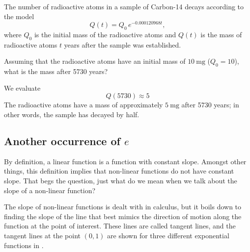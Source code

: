 \begin{pccexample}
	The number of radioactive atoms in a sample of Carbon-14 decays according to the model
	\[
		Q(t)= Q_0\,e^{-0.000120968t},
	\]
	where $Q_0$ is the initial mass of the radioactive atoms and $Q(t)$ is the mass of radioactive atoms $t$ years after the sample was established.
										
	Assuming that the radioactive atoms have an initial mass of $\SI{10}{\milli\gram}$  ($Q_0=10$),
	what is the mass after 5730 years?
	\begin{pccsolution}
		We evaluate
		\[
			Q(5730)\approx 5
		\]
		The radioactive atoms have a mass of approximately $\SI{5}{\milli\gram}$  after 5730 years; in other 
		words, the sample has decayed by half.
	\end{pccsolution}
\end{pccexample}
			
			
\subsection*{Another occurrence of $e$}
By definition, a linear function is a function with constant slope.  
Amongst other things, this definition implies that non-linear 
functions do not have constant slope.  That begs the question, 
just what do we mean when we talk about the slope of a non-linear 
function?  
			
The slope of non-linear functions is dealt with in calculus, but it boils 
down to finding the slope of the line that best mimics the direction of 
motion along the function at the point of interest.  These lines are 
called tangent lines, and the tangent lines at the point $(0,1)$ are shown for three 
different exponential functions in .
			
